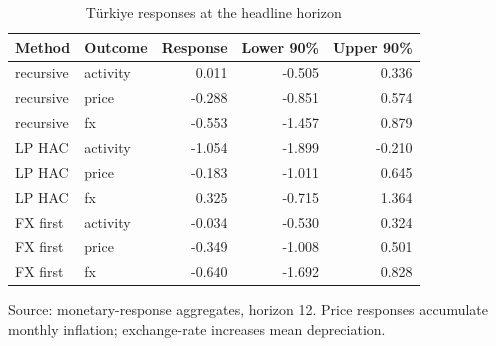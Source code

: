 \begin{table}[htbp]
\centering
\small
\caption{Türkiye responses at the headline horizon}
\begin{tabularx}{\linewidth}{Xlrrr}
\toprule
Method & Outcome & Response & Lower 90\% & Upper 90\% \\
\midrule
recursive & activity & 0.011 & -0.505 & 0.336 \\
recursive & price & -0.288 & -0.851 & 0.574 \\
recursive & fx & -0.553 & -1.457 & 0.879 \\
LP HAC & activity & -1.054 & -1.899 & -0.210 \\
LP HAC & price & -0.183 & -1.011 & 0.645 \\
LP HAC & fx & 0.325 & -0.715 & 1.364 \\
FX first & activity & -0.034 & -0.530 & 0.324 \\
FX first & price & -0.349 & -1.008 & 0.501 \\
FX first & fx & -0.640 & -1.692 & 0.828 \\
\bottomrule
\end{tabularx}
\par\vspace{3pt}\begin{minipage}{\linewidth}\footnotesize Source: monetary-response aggregates, horizon 12.\allowbreak{} Price responses accumulate monthly inflation; exchange-rate increases mean depreciation.\allowbreak{}\end{minipage}
\end{table}
